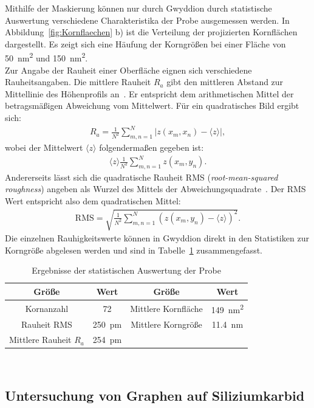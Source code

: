 \documentclass[a4paper,twoside,final]{article}
\begin{document}
Mithilfe der Maskierung können nur durch Gwyddion durch statistische Auswertung verschiedene Charakteristika der Probe ausgemessen werden. In Abbildung~\ref{fig:Kornflaechen} b) ist die Verteilung der projizierten Kornflächen dargestellt. Es zeigt sich eine Häufung der Korngrößen bei einer Fläche von \SI{50}{\nano\metre\squared} und \SI{150}{\nano\metre\squared}.\\
Zur Angabe der Rauheit einer Oberfläche eignen sich verschiedene Rauheitsangaben. Die mittlere Rauheit $R_a$ gibt den mittleren Abstand zur Mittellinie des Höhenprofils an~\cite{Rauheit}. Er entspricht dem arithmetischen Mittel der betragsmäßigen Abweichung vom Mittelwert. Für ein quadratisches Bild ergibt sich:
\begin{align}
  R_a = \frac{1}{N^2} \sum_{m,n = 1}^N |z(x_m, x_n) - \langle z \rangle|,
\end{align}
wobei der Mittelwert $\langle z \rangle$ folgendermaßen gegeben ist:
\begin{align}
  \langle z \rangle \frac{1}{N^2} \sum_{m,n = 1}^N z(x_m, y_n).
\end{align}
Andererseits lässt sich die quadratische Rauheit RMS (\textit{root-mean-squared roughness}) angeben als Wurzel des Mittels der Abweichungsquadrate~\cite{Rauheit}.
Der RMS Wert entspricht also dem quadratischen Mittel:
\begin{align}
  \text{RMS} = \sqrt{\frac{1}{N^2}\sum_{m,n = 1}^N (z(x_m, y_n)-\langle z\rangle)^2}.
\end{align}
Die einzelnen Rauhigkeitswerte können in Gwyddion direkt in den Statistiken zur Korngröße abgelesen werden und sind in Tabelle~\ref{tab:ErgebnisseGoldprobe} zusammengefasst.
\begin{table}[ht]
	\centering
	\caption{Ergebnisse der statistischen Auswertung der Probe}
	\label{tab:ErgebnisseGoldprobe}
  \begin{tabular}{c c c c}
   \toprule
   Größe & Wert & Größe & Wert\\
   \midrule
   Kornanzahl & 72 & Mittlere Kornfläche & \SI{149}{\nano\metre\squared}\\
   Rauheit RMS & \SI{250}{\pico\metre} & Mittlere Korngröße & \SI{11.4}{\nano\metre}\\
   Mittlere Rauheit $R_a$ & \SI{254}{\pico\metre} & &\\
   \bottomrule
  \end{tabular}
\end{table}\\

\subsection{Untersuchung von Graphen auf Siliziumkarbid}
\end{document}
